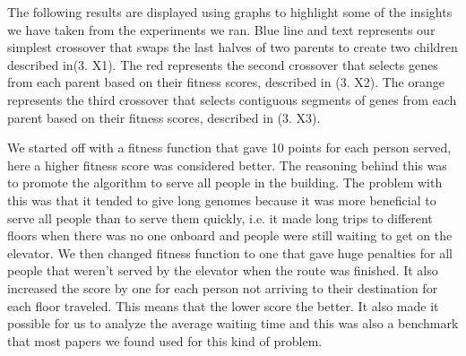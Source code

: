 






The following results are displayed using graphs to highlight some of the insights we have taken from the experiments we ran. Blue line and text represents our simplest crossover that swaps the last halves of two parents to create two children described in(3. X1). The red represents the second crossover that selects genes from each parent based on their fitness scores, described in (3. X2). The orange represents the third crossover that selects contiguous segments of genes from each parent based on their fitness scores, described in (3. X3).

We started off with a fitness function that gave 10 points for each person served, here a higher fitness score was considered better. The reasoning behind this was to promote the algorithm to serve all people in the building. The problem with this was that it tended to give long genomes because it was more beneficial to serve all people than to serve them quickly, i.e. it made long trips to different floors when there was no one onboard and people were still waiting to get on the elevator.  We then changed fitness function to one that gave huge penalties for all people that weren’t served by the elevator when the route was finished. It also increased the score by one for each person not arriving to their destination for each floor traveled. This means that the lower score the better. It also made it possible for us to analyze the average waiting time and this was also a benchmark that most papers we found used for this kind of problem. 

\newpage

